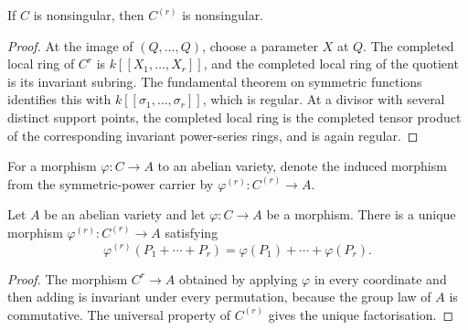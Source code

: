 \begin{lemma}
  \label{lem:symmetric_power_nonsingular}

  If \(C\) is nonsingular, then \(C^{(r)}\) is nonsingular.
\end{lemma}

\begin{proof}
  At the image of \((Q,\ldots,Q)\), choose a parameter \(X\) at \(Q\).
  The completed local ring of \(C^r\) is
  \(k[[X_1,\ldots,X_r]]\), and the completed local ring of the quotient is
  its invariant subring.  The fundamental theorem on symmetric functions
  identifies this with
  \(k[[\sigma_1,\ldots,\sigma_r]]\), which is regular.  At a divisor with
  several distinct support points, the completed local ring is the
  completed tensor product of the corresponding invariant power-series
  rings, and is again regular.
\end{proof}

\begin{definition}
  \label{def:symmetric_product_av_map}

  For a morphism \(\varphi\colon C\to A\) to an abelian variety, denote the
  induced morphism from the symmetric-power carrier by
  \(\varphi^{(r)}\colon C^{(r)}\to A\).
\end{definition}

\begin{lemma}
  \label{lem:symmetric_product_av_map}

  Let \(A\) be an abelian variety and let \(\varphi\colon C\to A\) be a
  morphism.  There is a unique morphism
  \(\varphi^{(r)}\colon C^{(r)}\to A\) satisfying
  \[
    \varphi^{(r)}(P_1+\cdots+P_r)
      =\varphi(P_1)+\cdots+\varphi(P_r).
  \]
\end{lemma}

\begin{proof}
  The morphism \(C^r\to A\) obtained by applying \(\varphi\) in every
  coordinate and then adding is invariant under every permutation, because
  the group law of \(A\) is commutative.  The universal property of
  \(C^{(r)}\) gives the unique factorisation.
\end{proof}

